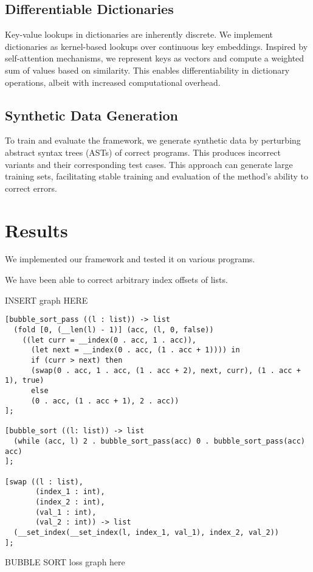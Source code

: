 \documentclass{article}
\begin{document}
\subsection{Differentiable Dictionaries}
Key-value lookups in dictionaries are inherently discrete. We implement dictionaries as kernel-based lookups over continuous key embeddings. Inspired by self-attention mechanisms, we represent keys as vectors and compute a weighted sum of values based on similarity. This enables differentiability in dictionary operations, albeit with increased computational overhead.

\subsection{Synthetic Data Generation}
To train and evaluate the framework, we generate synthetic data by perturbing abstract syntax trees (ASTs) of correct programs. This produces incorrect variants and their corresponding test cases. This approach can generate large training sets, facilitating stable training and evaluation of the method’s ability to correct errors.

\section{Results}
We implemented our framework and tested it on various programs.

We have been able to correct arbitrary index offsets of lists.

INSERT graph HERE

\begin{verbatim}
[bubble_sort_pass ((l : list)) -> list
  (fold [0, (__len(l) - 1)] (acc, (l, 0, false))
    ((let curr = __index(0 . acc, 1 . acc)),
      (let next = __index(0 . acc, (1 . acc + 1)))) in
      if (curr > next) then
      (swap(0 . acc, 1 . acc, (1 . acc + 2), next, curr), (1 . acc + 1), true)
      else
      (0 . acc, (1 . acc + 1), 2 . acc))
];

[bubble_sort ((l: list)) -> list
  (while (acc, l) 2 . bubble_sort_pass(acc) 0 . bubble_sort_pass(acc) acc)
];

[swap ((l : list),
       (index_1 : int),
       (index_2 : int),
       (val_1 : int),
       (val_2 : int)) -> list
  (__set_index(__set_index(l, index_1, val_1), index_2, val_2))
];
\end{verbatim}

BUBBLE SORT loss graph here
\end{document}
